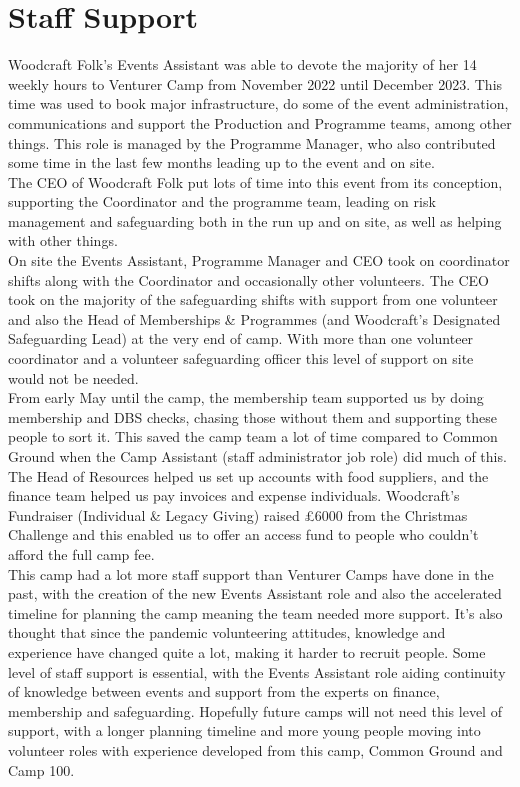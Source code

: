 \chapter{Staff Support}
Woodcraft Folk's Events Assistant was able to devote the majority of her 14 weekly hours to Venturer Camp from November 2022 until December 2023. This time was used to book major infrastructure, do some of the event administration, communications and support the Production and Programme teams, among other things. This role is managed by the Programme Manager, who also contributed some time in the last few months leading up to the event and on site. \\

The CEO of Woodcraft Folk put lots of time into this event from its conception, supporting the Coordinator and the programme team, leading on risk management and safeguarding both in the run up and on site, as well as helping with other things.\\

On site the Events Assistant, Programme Manager and CEO took on coordinator shifts along with the Coordinator and occasionally other volunteers. The CEO took on the majority of the safeguarding shifts with support from one volunteer and also the Head of Memberships \& Programmes (and Woodcraft's Designated Safeguarding Lead) at the very end of camp. With more than one volunteer coordinator and a volunteer safeguarding officer this level of support on site would not be needed.\\

From early May until the camp, the membership team supported us by doing membership and DBS checks, chasing those without them and supporting these people to sort it. This saved the camp team a lot of time compared to Common Ground when the Camp Assistant (staff administrator job role) did much of this. \\

The Head of Resources helped us set up accounts with food suppliers, and the finance team helped us pay invoices and expense individuals. Woodcraft's Fundraiser (Individual \& Legacy Giving) raised £6000 from the Christmas Challenge and this enabled us to offer an access fund to people who couldn't afford the full camp fee.\\

This camp had a lot more staff support than Venturer Camps have done in the past, with the creation of the new Events Assistant role and also the accelerated timeline for planning the camp meaning the team needed more support. It's also thought that since the pandemic volunteering attitudes, knowledge and experience have changed quite a lot, making it harder to recruit people. Some level of staff support is essential, with the Events Assistant role aiding continuity of knowledge between events and support from the experts on finance, membership and safeguarding. Hopefully future camps will not need this level of support, with a longer planning timeline and more young people moving into volunteer roles with experience developed from this camp, Common Ground and Camp 100.
